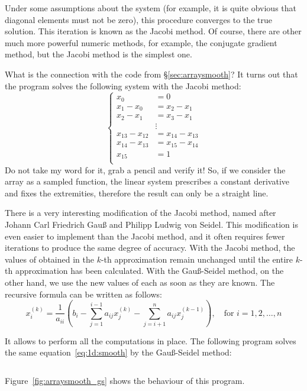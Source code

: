 \documentclass[notitlepage,oneside]{book}
\begin{document}
Under some assumptions about the system (for example, it is quite obvious that diagonal elements must not be zero), this procedure converges to the true solution.
This iteration is known as the Jacobi method.
Of course, there are other much more powerful numeric methods, for example, the conjugate gradient method, but the Jacobi method is the simplest one.

What is the connection with the code from \S\ref{sec:arraysmooth}? It turns out that the program solves the following system with the Jacobi method:
\begin{equation}
\label{eq:1d:smooth}
\left\{
\begin{array}{rl}
 x_0 &= 0 \\
x_1-x_0 &= x_2-x_1 \\
x_2-x_1 &= x_3-x_1 \\
     &  \vdots \\
x_{13}-x_{12}     &= x_{14}-x_{13} \\
x_{14}-x_{13}     &= x_{15}-x_{14} \\
x_{15} &= 1 \\
\end{array}
\right.
\end{equation}
Do not take my word for it, grab a pencil and verify it!
So, if we consider the array as a sampled function, the linear system prescribes a constant derivative and fixes the extremities, therefore the result can only be a straight line.

There is a very interesting modification of the Jacobi method, named after Johann Carl Friedrich Gauß and Philipp Ludwig von Seidel.
This modification is even easier to implement than the Jacobi method, and it often requires fewer iterations to produce the same degree of accuracy.
With the Jacobi method, the values of obtained in the $k$-th approximation remain unchanged until the entire
$k$-th approximation has been calculated. With the Gauß-Seidel method, on the other hand, we use the new values of each as soon as they are known.
The recursive formula can be written as follows:
$$
x_i^{(k)} = \frac{1}{a_{ii}} \left(b_i - \sum\limits_{j=1}^{i-1} a_{ij}x_j^{(k)} -  \sum\limits_{j=i+1}^n a_{ij}x_j^{(k-1)} \right), \quad \text{for } i=1,2,\dots,n
$$

It allows to perform all the computations in place. The following program solves the same equation~\eqref{eq:1d:smooth} by the Gauß-Seidel method:
\inputminted[frame=single,linenos=true]{python}{listings/example_3.2.py}
Figure~\ref{fig:arraysmooth_gs} shows the behaviour of this program.
\end{document}
